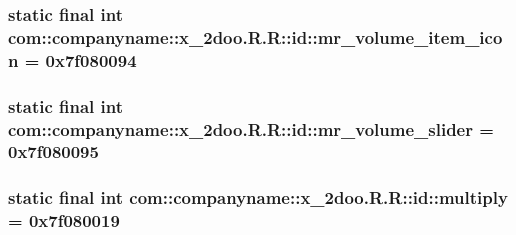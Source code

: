 \hypertarget{classcom_1_1companyname_1_1x__2doo_1_1_r_1_1id_ca33ed1fb7b3f588e832407e1917bc34}{
\subsubsection[{mr\_\-volume\_\-item\_\-icon}]{\setlength{\rightskip}{0pt plus 5cm}static final int com::companyname::x\_\-2doo.R.R::id::mr\_\-volume\_\-item\_\-icon = 0x7f080094}}
\label{classcom_1_1companyname_1_1x__2doo_1_1_r_1_1id_ca33ed1fb7b3f588e832407e1917bc34}


\hypertarget{classcom_1_1companyname_1_1x__2doo_1_1_r_1_1id_aebaf147268c56dfbf4e68a143084dc0}{
\subsubsection[{mr\_\-volume\_\-slider}]{\setlength{\rightskip}{0pt plus 5cm}static final int com::companyname::x\_\-2doo.R.R::id::mr\_\-volume\_\-slider = 0x7f080095}}
\label{classcom_1_1companyname_1_1x__2doo_1_1_r_1_1id_aebaf147268c56dfbf4e68a143084dc0}


\hypertarget{classcom_1_1companyname_1_1x__2doo_1_1_r_1_1id_863bf67972549b4a1426a6aad13c7d00}{
\subsubsection[{multiply}]{\setlength{\rightskip}{0pt plus 5cm}static final int com::companyname::x\_\-2doo.R.R::id::multiply = 0x7f080019}}
\label{classcom_1_1companyname_1_1x__2doo_1_1_r_1_1id_863bf67972549b4a1426a6aad13c7d00}


